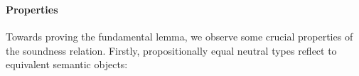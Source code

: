 \documentclass[sigplan,screen]{acmart}
\begin{document}
\begin{AgdaAlign}
\begin{code}
\\
%
\>[6]\AgdaSymbol{(}\AgdaSpace{}%
\AgdaOperator{\AgdaInductiveConstructor{,}}\AgdaSpace{}%
\AgdaSymbol{)}\AgdaSpace{}%
\AgdaSpace{}%
\AgdaSymbol{(}\AgdaSpace{}%
\AgdaOperator{\AgdaInductiveConstructor{,}}\AgdaSpace{}%
\AgdaSymbol{)}\AgdaSpace{}%
\AgdaSymbol{=}\AgdaSpace{}%
\AgdaSpace{}%
\AgdaSpace{}%
\AgdaSpace{}%
\AgdaSpace{}%
\AgdaSpace{}%
\AgdaSpace{}%
\<%
\end{code}
\begin{code}[hide]%
%
\>[2]\AgdaSpace{}%
\AgdaSymbol{|}\AgdaSpace{}%
\AgdaSpace{}%
\AgdaSymbol{\AgdaUnderscore{}}\AgdaSpace{}%
\AgdaSymbol{=}\AgdaSpace{}%
\<%
\\
%
\>[2]\AgdaSymbol{\AgdaUnderscore{}}\AgdaSpace{}%
\AgdaSpace{}%
\AgdaSymbol{\AgdaUnderscore{}}\AgdaSpace{}%
\AgdaSymbol{=}\AgdaSpace{}%
\<%
\end{code}
\end{AgdaAlign}

\paragraph{Properties}

Towards proving the fundamental lemma, we observe some crucial properties of the soundness relation. Firstly, propositionally equal neutral types reflect to equivalent semantic objects:
\end{document}

